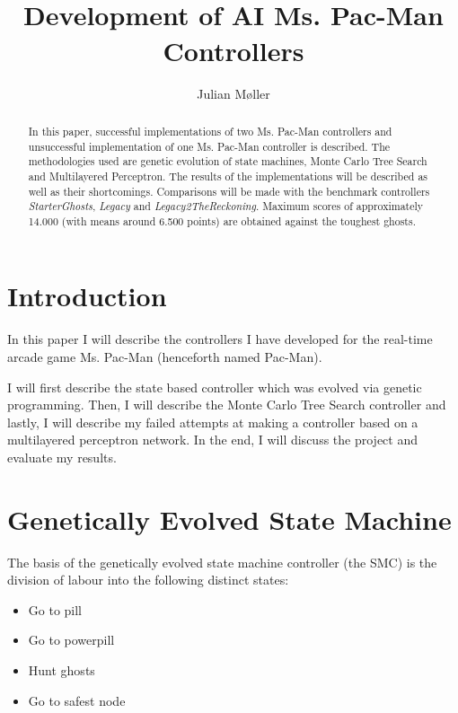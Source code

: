 \documentclass[conference]{IEEEtran}
\begin{document}
\title{\ \\ \LARGE\bf Development of AI Ms. Pac-Man Controllers}

\author{Julian Møller}


\maketitle

\begin{abstract}
In this paper, successful implementations of two Ms. Pac-Man controllers and unsuccessful implementation of one Ms. Pac-Man controller is described. The methodologies used are genetic evolution of state machines, Monte Carlo Tree Search and Multilayered Perceptron.
The results of the implementations will be described as well as their shortcomings. Comparisons will be made with the benchmark controllers
\emph{StarterGhosts}, \emph{Legacy} and \emph{Legacy2TheReckoning}. Maximum scores of approximately 14.000 (with means around 6.500 points)
are obtained against the toughest ghosts.
\end{abstract}

\section{Introduction}
In this paper I will describe the controllers I have developed for the real-time arcade game Ms. Pac-Man (henceforth named Pac-Man).

I will first describe the state based controller which was evolved via genetic programming. Then, I will describe the Monte Carlo Tree
Search controller and lastly, I will describe my failed attempts at making a controller based on a multilayered perceptron network. In
the end, I will discuss the project and evaluate my results.

\section{Genetically Evolved State Machine}

The basis of the genetically evolved state machine controller (the SMC) is the division of labour into the following distinct states:
\begin{itemize}
\item Go to pill
\item Go to powerpill
\item Hunt ghosts
\item Go to safest node
\end{itemize}
\end{document}

